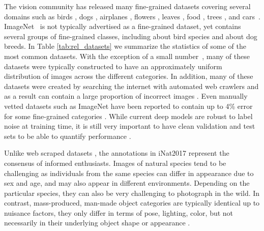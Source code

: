 \documentclass[10pt,twocolumn,letterpaper]{article}
\begin{document}
The vision community has released many fine-grained datasets covering several domains such as birds \cite{welinder2010caltech,wah2011caltech,berg2014birdsnap,van2015building, krause2016unreasonable}, dogs \cite{KhoslaYaoJayadevaprakashFeiFei_FGVC2011,parkhi12a,liu2012dog}, airplanes \cite{maji2013fine,vedaldi2014understanding}, flowers \cite{nilsback2006visual}, leaves \cite{kumar2012leafsnap}, food \cite{hou2017vegfru}, trees \cite{wegner2016cataloging}, and cars~\cite{krause20133d,lin2014jointly, yang2015large, gebru2017fine}. ImageNet~\cite{russakovsky2015imagenet} is not typically advertised as a fine-grained dataset, yet contains several groups of fine-grained classes, including about  bird species and about  dog breeds. 
In Table \ref{tab:rel_datasets} we summarize the statistics of some of the most common datasets. 
With the exception of a small number~\eg\cite{krause2016unreasonable, gebru2017fine}, many of these datasets were typically constructed to have an approximately uniform distribution of images across the different categories.
In addition, many of these datasets were created by searching the internet with automated web crawlers and as a result can contain a large proportion of incorrect images \eg \cite{krause2016unreasonable}.
Even manually vetted datasets such as ImageNet \cite{russakovsky2015imagenet} have been reported to contain up to 4\% error for some fine-grained categories \cite{van2015building}. 
While current deep models are robust to label noise at training time, it is still very important to have clean validation and test sets to be able to quantify performance \cite{van2015building, rolnick2017deep}.

Unlike web scraped datasets \cite{krause2016unreasonable, krasin2016openimages, wilber2017bam, hou2017vegfru}, the annotations in iNat2017 represent the consensus of informed enthusiasts. 
Images of natural species tend to be challenging as individuals from the same species can differ in appearance due to sex and age, and may also appear in different environments. 
Depending on the particular species, they can also be very challenging to photograph in the wild.
In contrast, mass-produced, man-made object categories are typically identical up to nuisance factors, \ie they only differ in terms of pose, lighting, color, but not necessarily in their underlying object shape or appearance \cite{yu2014fine, gebru2017fine, iMat2017}.
\end{document}
